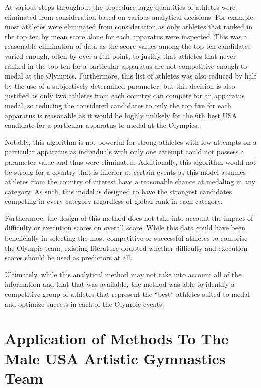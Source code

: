 \documentclass[12pt]{article}
\begin{document}
At various steps throughout the procedure large quantities of athletes were eliminated from consideration 
based on various analytical decisions. For example, most athletes were eliminated from consideration as 
only athletes that ranked in the top ten by mean score alone for each apparatus were inspected. This was a 
reasonable elimination of data as the score values among the top ten candidates varied enough, often by over a 
full point, to justify that athletes that never ranked in the top ten for a particular apparatus are not 
competitive enough to medal at the Olympics. Furthermore, this list of athletes was also reduced by half by the 
use of a subjectively determined parameter, but this decision is also justified as only two athletes from each 
country can compete for an apparatus medal, so reducing the considered candidates to only the top five for each 
apparatus is reasonable as it would be highly unlikely for the 6th best USA candidate for a particular apparatus 
to medal at the Olympics.

Notably, this algorithm is not powerful for strong athletes with few attempts on a particular apparatus as individuals 
with only one attempt could not possess a parameter value and thus were eliminated. Additionally, this algorithm 
would not be strong for a country that is inferior at certain events as this model assumes athletes from the country 
of interest have a reasonable chance at medaling in any category. As such, this model is designed to have the strongest 
candidates competing in every category regardless of global rank in each category.

Furthermore, the design of this method does not take into account the impact of difficulty or execution scores on 
overall score. While this data could have been beneficially in selecting the most competitive or successful athletes 
to comprise the Olympic team, existing literature doubted whether difficulty and execution scores should be 
used as predictors at all.

Ultimately, while this analytical method may not take into account all of the information and that that was available, 
the method was able to identify a competitive group of athletes that represent the ``best'' athletes suited 
to medal and optimize success in each of the Olympic events.


\appendix

\section{Application of Methods To The Male USA Artistic Gymnastics Team}
\label{appendix:men}
\end{document}
